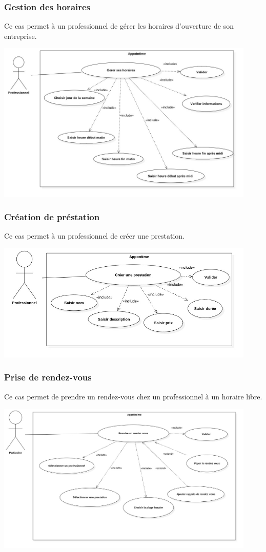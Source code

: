 \documentclass{article}
\begin{document}
\subsubsection{Gestion des horaires}
Ce cas permet à un professionnel de gérer les horaires d'ouverture de son entreprise.
\begin{center}
  \includegraphics[width=350pt]{diagram/useCaseGererHoraire}
\end{center}

\subsubsection{Création de préstation}
Ce cas permet à un professionnel de créer une prestation.
\begin{center}
  \includegraphics[width=350pt]{diagram/useCaseCreerPrestation}
\end{center}
\subsubsection{Prise de rendez-vous}
Ce cas permet de prendre un rendez-vous chez un professionnel à un horaire libre.
\begin{center}
  \includegraphics[width=350pt]{diagram/useCasePriseRdv}
\end{center}
\end{document}
